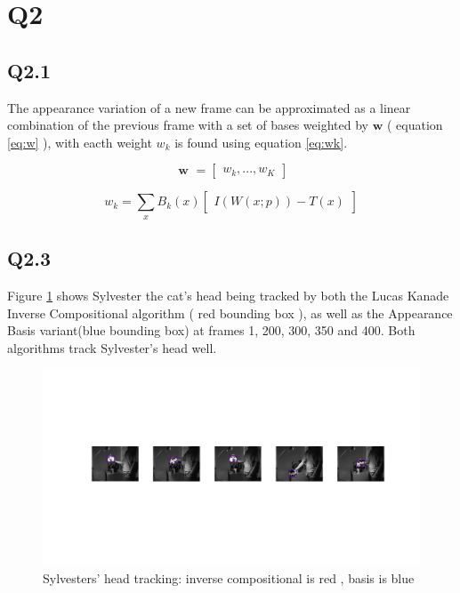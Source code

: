 \documentclass[12pt]{article}
\begin{document}
\section{Q2}
\subsection{Q2.1}
The appearance variation of a new frame can be approximated as a linear combination of the previous frame with a set of bases weighted by $\textbf{w}$ ( equation \ref{eq:w} ), with eacth weight $w_{k}$ is found using equation \ref{eq:wk}.

\begin{equation}
\label{eq:w}
\textbf { w } =
\begin{bmatrix}
w_{k}, ... , w_{K}
\end{bmatrix}
\end{equation}

\begin{equation}
\label{eq:wk}
w_{k}  = 
\sum_{x} B_{k} ( x )
\begin {bmatrix}
I ( W ( x ; p ) ) - T ( x )
\end {bmatrix}
\end{equation}

\subsection{Q2.3}
Figure \ref{fig:sylv} shows Sylvester the cat's head being tracked by both the Lucas Kanade Inverse Compositional algorithm ( red  bounding box ), as well as the Appearance Basis variant(blue bounding box) at frames 1, 200, 300, 350 and 400. Both algorithms track Sylvester's head well.
\begin{figure}[H]
\centering
\includegraphics[page=1,width=1.0\textwidth]{q23}
\caption{ Sylvesters' head tracking: inverse compositional is red , basis is blue } 
\label{fig:sylv}
\end{figure}   
\end{document}
